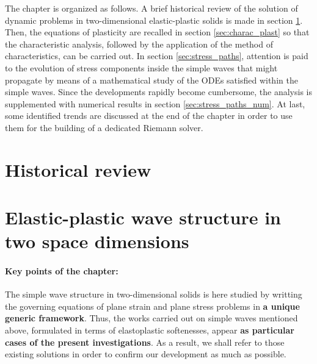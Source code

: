 The chapter is organized as follows.
A brief historical review of the solution of dynamic problems in two-dimensional elastic-plastic solids is made in section \ref{sec:review}.
Then, the equations of plasticity are recalled in section \ref{sec:charac_plast} so that the characteristic analysis, followed by the application of the method of characteristics, can be carried out.
In section \ref{sec:stress_paths}, attention is paid to the evolution of stress components inside the simple waves that might propagate by means of a mathematical study of the ODEs satisfied within the simple waves.
Since the developments rapidly become cumbersome, the analysis is supplemented with numerical results in section \ref{sec:stress_paths_num}.
At last, some identified trends are discussed at the end of the chapter in order to use them for the building of a dedicated Riemann solver. 

\section{Historical review}
\label{sec:review}




\section{Elastic-plastic wave structure in two space dimensions}
\paragraph*{Key points of the chapter:} The simple wave structure in two-dimensional solids is here studied by writting the governing equations of plane strain and plane stress problems in \textbf{a unique generic framework}.
Thus, the works carried out on simple waves mentioned above, formulated in terms of elastoplastic softenesses, appear \textbf{as particular cases of the present investigations}.
As a result, we shall refer to those existing solutions in order to confirm our development as much as possible.

